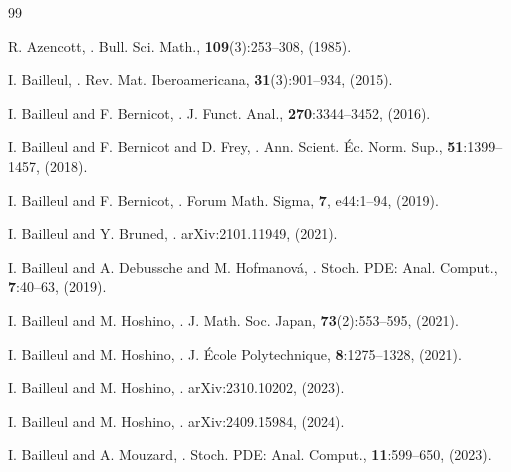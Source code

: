 \documentclass[10pt, reqno]{amsart}
\numberwithin{subsection}{section}
\numberwithin{subsubsection}{subsection}
\numberwithin{equation}{section} %
\theoremstyle{mystyle}
\theoremstyle{mystyle2}
\theoremstyle{mystyle3}
\begin{document}
\bigskip



\begin{thebibliography}{99}

R. Azencott,
.
\newblock Bull. Sci. Math., {\bf 109}(3):253--308, (1985).

I. Bailleul,
.
\newblock Rev. Mat. Iberoamericana, {\bf 31}(3):901--934, (2015). 

I. Bailleul and F. Bernicot,
.
\newblock J. Funct. Anal., {\bf 270}:3344--3452, (2016).

I. Bailleul and F. Bernicot and D. Frey,
.
\newblock Ann. Scient. \'Ec. Norm. Sup., {\bf 51}:1399--1457, (2018). 

I. Bailleul and F. Bernicot,
.
\newblock Forum Math. Sigma, {\bf 7}, e44:1--94, (2019).

I. Bailleul and Y. Bruned,
.
\newblock arXiv:2101.11949, (2021).   

I. Bailleul and A. Debussche and M. Hofmanov\'a,
.
\newblock Stoch. PDE: Anal. Comput., {\bf 7}:40--63, (2019).  
 

I. Bailleul and M. Hoshino,
.
\newblock J. Math. Soc. Japan, {\bf 73}(2):553--595, (2021).

I. Bailleul and M. Hoshino,
.
\newblock J. \'Ecole Polytechnique, {\bf 8}:1275--1328, (2021).

I. Bailleul and M. Hoshino,
.
\newblock arXiv:2310.10202, (2023).

I. Bailleul and M. Hoshino,
.
\newblock arXiv:2409.15984, (2024).

I. Bailleul and A. Mouzard,
.
\newblock Stoch. PDE: Anal. Comput., {\bf 11}:599--650, (2023).


\end{thebibliography}
\end{document}
